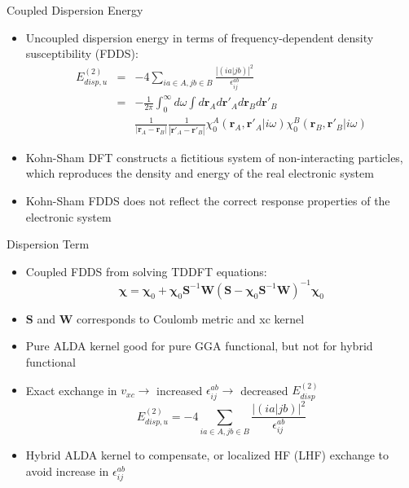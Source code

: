 \documentclass{beamer}
\begin{document}
        \begin{frame}{Coupled Dispersion Energy}
            \begin{itemize}
                \item Uncoupled dispersion energy in terms of frequency-dependent density susceptibility (FDDS):
                \begin{eqnarray}
                    \nonumber
                    E_{disp,u}^{(2)} &=& -4\sum_{ia \in A,jb \in B} \frac{\left|\left(ia|jb\right)\right|^2}{\epsilon_{ij}^{ab}}\\ \nonumber
                    &=& -\frac{1}{2\pi}\int_0^\infty d\omega \int d\mathbf{r}_A d\mathbf{r}'_A d\mathbf{r}_B d\mathbf{r}'_B \\ \nonumber
                    & & \frac{1}{|\mathbf{r}_A-\mathbf{r}_B|} \frac{1}{|\mathbf{r}'_A-\mathbf{r}'_B|} \chi_0^A\left(\mathbf{r}_A,\mathbf{r}'_A|i\omega\right)\chi_0^B\left(\mathbf{r}_B,\mathbf{r}'_B|i\omega\right)
                \end{eqnarray}
                \item Kohn-Sham DFT constructs a fictitious system of non-interacting particles, which reproduces the density and energy of the real electronic system
                \item Kohn-Sham FDDS does not reflect the correct response properties of the electronic system
            \end{itemize}
        \end{frame}

        \begin{frame}{Dispersion Term}
            \begin{itemize}
                \item Coupled FDDS from solving TDDFT equations:
                $$\boldsymbol{\chi} = \boldsymbol{\chi}_0 + \boldsymbol{\chi}_0 \mathbf{S}^{-1} \mathbf{W} \left( \mathbf{S} - \boldsymbol{\chi}_0 \mathbf{S}^{-1} \mathbf{W} \right)^{-1} \boldsymbol{\chi}_0$$
                \item $\mathbf{S}$ and $\mathbf{W}$ corresponds to Coulomb metric and xc kernel
                \item Pure ALDA kernel good for pure GGA functional, but not for hybrid functional 
                \item Exact exchange in $v_{xc} \rightarrow$ increased $\epsilon_{ij}^{ab} \rightarrow$ decreased $E_{disp}^{(2)}$ 
                $$E_{disp,u}^{(2)} = -4\sum_{ia \in A,jb \in B} \frac{\left|\left(ia|jb\right)\right|^2}{\epsilon_{ij}^{ab}}$$
                \item Hybrid ALDA kernel to compensate, or localized HF (LHF) exchange to avoid increase in $\epsilon_{ij}^{ab}$
            \end{itemize}            
        \end{frame}
\end{document}

